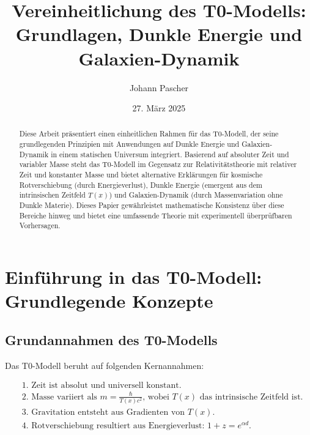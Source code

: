 \documentclass[a4paper,12pt]{article}
\theoremstyle{definition}
\theoremstyle{remark}
\newcommand{\Tfield}{T(x)}
\begin{document}
	
	\title{Vereinheitlichung des T0-Modells: \\ Grundlagen, Dunkle Energie und Galaxien-Dynamik}
	\author{Johann Pascher}
	\date{27. März 2025}
	\maketitle
	
	\begin{abstract}
		Diese Arbeit präsentiert einen einheitlichen Rahmen für das T0-Modell, der seine grundlegenden Prinzipien mit Anwendungen auf Dunkle Energie und Galaxien-Dynamik in einem statischen Universum integriert. Basierend auf absoluter Zeit und variabler Masse steht das T0-Modell im Gegensatz zur Relativitätstheorie mit relativer Zeit und konstanter Masse und bietet alternative Erklärungen für kosmische Rotverschiebung (durch Energieverlust), Dunkle Energie (emergent aus dem intrinsischen Zeitfeld \(\Tfield\)) und Galaxien-Dynamik (durch Massenvariation ohne Dunkle Materie). Dieses Papier gewährleistet mathematische Konsistenz über diese Bereiche hinweg und bietet eine umfassende Theorie mit experimentell überprüfbaren Vorhersagen.
	\end{abstract}
	
	\tableofcontents
	\newpage
	
	\section{Einführung in das T0-Modell: Grundlegende Konzepte}
	
	\subsection{Grundannahmen des T0-Modells}
	
	Das T0-Modell beruht auf folgenden Kernannahmen:
	
	\begin{tcolorbox}[colback=blue!5!white,colframe=blue!75!black,title=Grundannahmen des T0-Modells]
		\begin{align}
			&\text{1. Zeit ist absolut und universell konstant.} \\
			&\text{2. Masse variiert als $m = \frac{\hbar}{\Tfield c^2}$, wobei $\Tfield$ das intrinsische Zeitfeld ist.} \\
			&\text{3. Gravitation entsteht aus Gradienten von $\Tfield$.} \\
			&\text{4. Rotverschiebung resultiert aus Energieverlust: $1 + z = e^{\alpha d}$.}
		\end{align}
	\end{tcolorbox}
	
\end{document}
